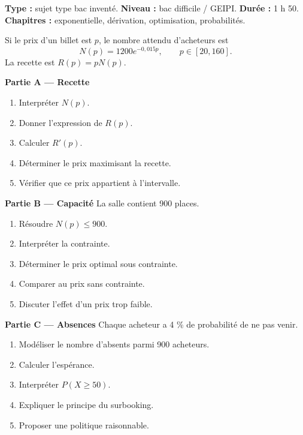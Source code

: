 \documentclass[11pt,a4paper]{article}
\begin{document}
\hypertarget{M-LONG-06}{}
\begin{sujettype}
\textbf{Type :} sujet type bac inventé.  
\textbf{Niveau :} bac difficile / GEIPI.  
\textbf{Durée :} 1 h 50.  
\textbf{Chapitres :} exponentielle, dérivation, optimisation, probabilités.

Si le prix d'un billet est $p$, le nombre attendu d'acheteurs est
\[
N(p)=1200e^{-0{,}015p},\qquad p\in[20,160].
\]
La recette est $R(p)=pN(p)$.

\textbf{Partie A — Recette}
\begin{enumerate}
  \item Interpréter $N(p)$.
  \item Donner l'expression de $R(p)$.
  \item Calculer $R'(p)$.
  \item Déterminer le prix maximisant la recette.
  \item Vérifier que ce prix appartient à l'intervalle.
\end{enumerate}

\textbf{Partie B — Capacité}
La salle contient 900 places.
\begin{enumerate}
  \item Résoudre $N(p)\leq900$.
  \item Interpréter la contrainte.
  \item Déterminer le prix optimal sous contrainte.
  \item Comparer au prix sans contrainte.
  \item Discuter l'effet d'un prix trop faible.
\end{enumerate}

\textbf{Partie C — Absences}
Chaque acheteur a 4 \% de probabilité de ne pas venir.
\begin{enumerate}
  \item Modéliser le nombre d'absents parmi 900 acheteurs.
  \item Calculer l'espérance.
  \item Interpréter $P(X\geq50)$.
  \item Expliquer le principe du surbooking.
  \item Proposer une politique raisonnable.
\end{enumerate}
\end{sujettype}
\end{document}

